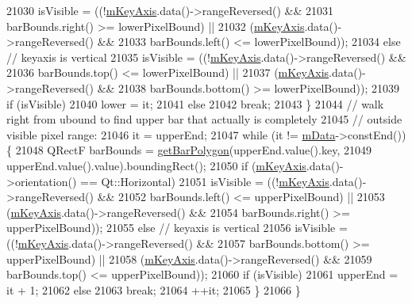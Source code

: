 \begin{DoxyCode}
21030       isVisible = ((!\hyperlink{class_q_c_p_abstract_plottable_a426f42e254d0f8ce5436a868c61a6827}{mKeyAxis}.data()->rangeReversed() &&
21031                     barBounds.right() >= lowerPixelBound) ||
21032                    (\hyperlink{class_q_c_p_abstract_plottable_a426f42e254d0f8ce5436a868c61a6827}{mKeyAxis}.data()->rangeReversed() &&
21033                     barBounds.left() <= lowerPixelBound));
21034     \textcolor{keywordflow}{else} \textcolor{comment}{// keyaxis is vertical}
21035       isVisible = ((!\hyperlink{class_q_c_p_abstract_plottable_a426f42e254d0f8ce5436a868c61a6827}{mKeyAxis}.data()->rangeReversed() &&
21036                     barBounds.top() <= lowerPixelBound) ||
21037                    (\hyperlink{class_q_c_p_abstract_plottable_a426f42e254d0f8ce5436a868c61a6827}{mKeyAxis}.data()->rangeReversed() &&
21038                     barBounds.bottom() >= lowerPixelBound));
21039     \textcolor{keywordflow}{if} (isVisible)
21040       lower = it;
21041     \textcolor{keywordflow}{else}
21042       \textcolor{keywordflow}{break};
21043   \}
21044   \textcolor{comment}{// walk right from ubound to find upper bar that actually is completely}
21045   \textcolor{comment}{// outside visible pixel range:}
21046   it = upperEnd;
21047   \textcolor{keywordflow}{while} (it != \hyperlink{class_q_c_p_bars_aef28d29d51ef84b608ecd22c55d531ff}{mData}->constEnd()) \{
21048     QRectF barBounds = \hyperlink{class_q_c_p_bars_a1d118a76662cfd691a78c6f573e3f78c}{getBarPolygon}(upperEnd.value().key,
21049                                      upperEnd.value().value).boundingRect();
21050     \textcolor{keywordflow}{if} (\hyperlink{class_q_c_p_abstract_plottable_a426f42e254d0f8ce5436a868c61a6827}{mKeyAxis}.data()->orientation() == Qt::Horizontal)
21051       isVisible = ((!\hyperlink{class_q_c_p_abstract_plottable_a426f42e254d0f8ce5436a868c61a6827}{mKeyAxis}.data()->rangeReversed() &&
21052                     barBounds.left() <= upperPixelBound) ||
21053                    (\hyperlink{class_q_c_p_abstract_plottable_a426f42e254d0f8ce5436a868c61a6827}{mKeyAxis}.data()->rangeReversed() &&
21054                     barBounds.right() >= upperPixelBound));
21055     \textcolor{keywordflow}{else} \textcolor{comment}{// keyaxis is vertical}
21056       isVisible = ((!\hyperlink{class_q_c_p_abstract_plottable_a426f42e254d0f8ce5436a868c61a6827}{mKeyAxis}.data()->rangeReversed() &&
21057                     barBounds.bottom() >= upperPixelBound) ||
21058                    (\hyperlink{class_q_c_p_abstract_plottable_a426f42e254d0f8ce5436a868c61a6827}{mKeyAxis}.data()->rangeReversed() &&
21059                     barBounds.top() <= upperPixelBound));
21060     \textcolor{keywordflow}{if} (isVisible)
21061       upperEnd = it + 1;
21062     \textcolor{keywordflow}{else}
21063       \textcolor{keywordflow}{break};
21064     ++it;
21065   \}
21066 \}
\end{DoxyCode}


